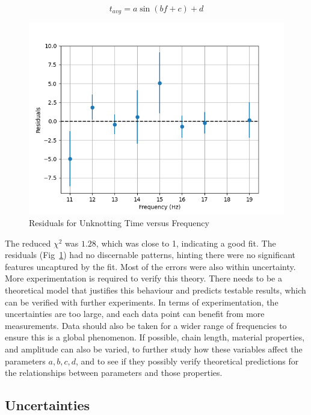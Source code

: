 \documentclass[12pt]{IEEEtran}
\begin{document}
\begin{equation}\label{guess}
    t_{avg} = a\sin(bf + c) + d
\end{equation}

\begin{figure}[h]
    \includegraphics[scale=0.5]{part2_res.png}
    \caption{Residuals for Unknotting Time versus Frequency}\label{part2res}
\end{figure}

The reduced $\chi^2$ was $1.28$, which was close to 1, indicating a good fit. The residuals (Fig~\ref{part2res}) had no discernable patterns, hinting there were no significant features uncaptured by the fit. Most of the errors were also within uncertainty. \\
More experimentation is required to verify this theory. There needs to be a theoretical model that justifies this behaviour and predicts testable results, which can be verified with further experiments. In terms of experimentation, the uncertainties are too large, and each data point can benefit from more measurements. Data should also be taken for a wider range of frequencies to ensure this is a global phenomenon. If possible, chain length, material properties, and amplitude can also be varied, to further study how these variables affect the parameters $a,b,c,d$, and to see if they possibly verify theoretical predictions for the relationships between parameters and those properties.

\subsection{Uncertainties}
\end{document}
